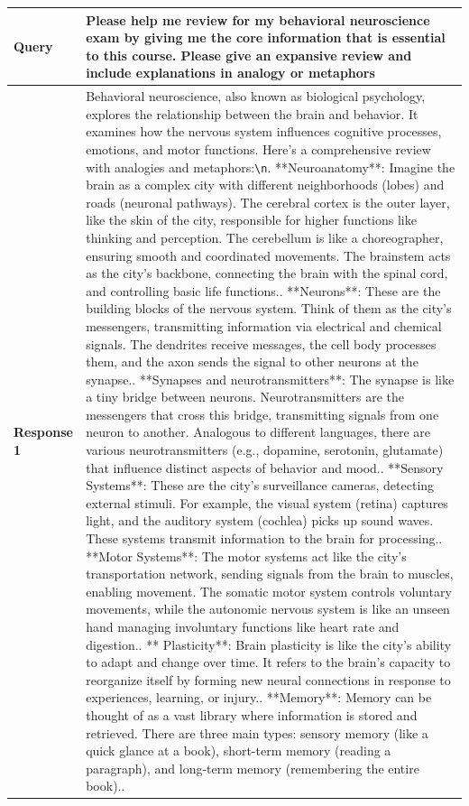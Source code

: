 \documentclass{article} %
\begin{document}
\begin{center}
\small
\begin{longtable}{p{2.8cm}|p{10cm}}
\toprule
\endhead
   \textbf{Query}   &    Please help me review for my behavioral neuroscience exam by giving me the core information that is essential to this course. Please give an expansive review and include explanations in analogy or metaphors    \\ \midrule
   \textbf{Response 1}   &     Behavioral neuroscience, also known as biological psychology, explores the relationship between the brain and behavior. It examines how the nervous system influences cognitive processes, emotions, and motor functions. Here's a comprehensive review with analogies and metaphors:\verb|\n|\newline 1. **Neuroanatomy**: Imagine the brain as a complex city with different neighborhoods (lobes) and roads (neuronal pathways). The cerebral cortex is the outer layer, like the skin of the city, responsible for higher functions like thinking and perception. The cerebellum is like a choreographer, ensuring smooth and coordinated movements. The brainstem acts as the city's backbone, connecting the brain with the spinal cord, and controlling basic life functions.\newline 2. **Neurons**: These are the building blocks of the nervous system. Think of them as the city's messengers, transmitting information via electrical and chemical signals. The dendrites receive messages, the cell body processes them, and the axon sends the signal to other neurons at the synapse.\newline 3. **Synapses and neurotransmitters**: The synapse is like a tiny bridge between neurons. Neurotransmitters are the messengers that cross this bridge, transmitting signals from one neuron to another. Analogous to different languages, there are various neurotransmitters (e.g., dopamine, serotonin, glutamate) that influence distinct aspects of behavior and mood.\newline4. **Sensory Systems**: These are the city's surveillance cameras, detecting external stimuli. For example, the visual system (retina) captures light, and the auditory system (cochlea) picks up sound waves. These systems transmit information to the brain for processing.\newline 5. **Motor Systems**: The motor systems act like the city's transportation network, sending signals from the brain to muscles, enabling movement. The somatic motor system controls voluntary movements, while the autonomic nervous system is like an unseen hand managing involuntary functions like heart rate and digestion.\newline6. ** Plasticity**: Brain plasticity is like the city's ability to adapt and change over time. It refers to the brain's capacity to reorganize itself by forming new neural connections in response to experiences, learning, or injury.\newline 7. **Memory**: Memory can be thought of as a vast library where information is stored and retrieved. There are three main types: sensory memory (like a quick glance at a book), short-term memory (reading a paragraph), and long-term memory (remembering the entire book).\newline 8. 
\end{longtable}
\end{center}
\end{document}
